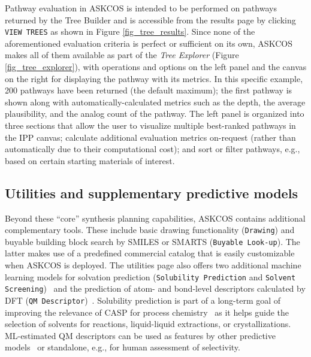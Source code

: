 \documentclass[pdflatex,sn-mathphys-num]{sn-jnl}%
\theoremstyle{thmstyleone}%
\theoremstyle{thmstyletwo}%
\theoremstyle{thmstylethree}%
\begin{document}
Pathway evaluation in ASKCOS is intended to be performed on pathways returned by the Tree Builder and is accessible from the results page by clicking \texttt{VIEW TREES} as shown in Figure \ref{fig_tree_results}. Since none of the aforementioned evaluation criteria is perfect or sufficient on its own, ASKCOS makes all of them available as part of the \emph{Tree Explorer} (Figure \ref{fig_tree_explorer}), with operations and options on the left panel and the canvas on the right for displaying the pathway with its metrics. In this specific example, 200 pathways have been returned (the default maximum); the first pathway is shown along with automatically-calculated metrics such as the depth, the average plausibility, and the analog count of the pathway. The left panel is organized into three sections that allow the user to visualize multiple best-ranked pathways in the IPP canvas; calculate additional evaluation metrics on-request (rather than automatically due to their computational cost); and sort or filter pathways, e.g., based on certain starting materials of interest.

\subsection{Utilities and supplementary predictive models}\label{results_utilities}


Beyond these ``core'' synthesis planning capabilities, ASKCOS contains additional complementary tools. These include basic drawing functionality (\texttt{Drawing}) and buyable building block search by SMILES or SMARTS (\texttt{Buyable Look-up}). The latter makes use of a predefined commercial catalog that is easily customizable when ASKCOS is deployed. The utilities page also offers two additional machine learning models for solvation prediction (\texttt{Solubility Prediction} and \texttt{Solvent Screening})~\citep{vermeire_predicting_2022} and the prediction of atom- and bond-level descriptors calculated by DFT (\texttt{QM Descriptor})~\citep{guan_regio-selectivity_2021,li_when_2024}. Solubility prediction is part of a long-term goal of improving the relevance of CASP for process chemistry~\citep{griffin_opportunities_2023} as it helps guide the selection of solvents for reactions, liquid-liquid extractions, or crystallizations. ML-estimated QM descriptors can be used as features by other predictive models~\citep{stuyver2022quantum} or standalone, e.g., for human assessment of selectivity. 
\end{document}

